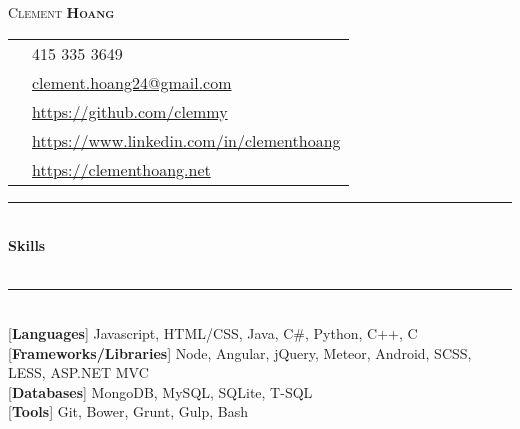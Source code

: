 \documentclass[10pt]{article}
\newcommand{\cvtitle}[4] {%
	{\LARGE\color{#2}\textsc{#1}}\hspace{\stretch{3}}{\large \textbf{#3}}\\[#4]}
\newcommand{\positionedbox}[3]{%
	\begin{minipage}{#2}
		\begin{flush#1}
			#3
		\end{flush#1}
	\end{minipage}}
\newcommand{\cvsectiontitle}[1]{%
	\rule{\linewidth}{0.2mm}\\%
		{\large\indent\textbf{#1}}\\%
	\\[-6.5mm]\rule{\linewidth}{0.2mm}\\[2mm]%
	}
\begin{document}
\cvtitle{Clement \textbf{Hoang}}{BrickRed}{}{0.3cm}
\positionedbox{left}{0.7\textwidth}{
	\begin{tabular}{ c l }
		{\FA \faPhone} & 415 335 3649 \\
		{\FA \faEnvelope} & \href{mailto:clement.hoang24@gmail.com}{clement.hoang24@gmail.com} \\
		{\FA \faGithub} & \href{https://github.com/clemmy}{https://github.com/clemmy} \\
		{\FA \faLinkedIn} & \href{https://www.linkedin.com/in/clementhoang}{https://www.linkedin.com/in/clementhoang} \\
		{\FA \faFire} & \href{https://clementhoang.net}{https://clementhoang.net}
	\end{tabular}
}
\vspace{0.2cm}

\cvsectiontitle{Skills}
[\textbf{Languages}] Javascript, HTML/CSS, Java, C\#, Python, C++, C \\[0.2cm]
[\textbf{Frameworks/Libraries}] Node, Angular, jQuery, Meteor, Android, SCSS, LESS, ASP.NET MVC \\[0.2cm]
[\textbf{Databases}] MongoDB, MySQL, SQLite, T-SQL \\[0.2cm]
[\textbf{Tools}] Git, Bower, Grunt, Gulp, Bash
\end{document}
